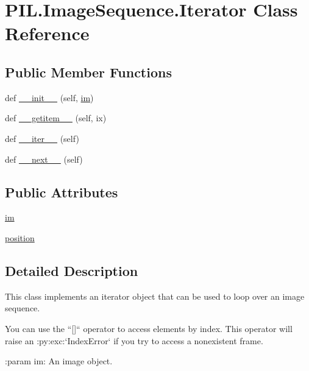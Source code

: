 \hypertarget{classPIL_1_1ImageSequence_1_1Iterator}{}\section{P\+I\+L.\+Image\+Sequence.\+Iterator Class Reference}
\label{classPIL_1_1ImageSequence_1_1Iterator}
\subsection*{Public Member Functions}
\begin{DoxyCompactItemize}
\item 
def \hyperlink{classPIL_1_1ImageSequence_1_1Iterator_a8119a58e651fe637a37376709d49a78a}{\+\_\+\+\_\+init\+\_\+\+\_\+} (self, \hyperlink{classPIL_1_1ImageSequence_1_1Iterator_a4aed17166801d2e3a6f334aef48f06e1}{im})
\item 
def \hyperlink{classPIL_1_1ImageSequence_1_1Iterator_a0aca8634fbe3f8905f37fe6f5c68d663}{\+\_\+\+\_\+getitem\+\_\+\+\_\+} (self, ix)
\item 
def \hyperlink{classPIL_1_1ImageSequence_1_1Iterator_a9d8b27292e63547887be7afd4fa87790}{\+\_\+\+\_\+iter\+\_\+\+\_\+} (self)
\item 
def \hyperlink{classPIL_1_1ImageSequence_1_1Iterator_a2e579dd30b58258f7fed69b955e3c9da}{\+\_\+\+\_\+next\+\_\+\+\_\+} (self)
\end{DoxyCompactItemize}
\subsection*{Public Attributes}
\begin{DoxyCompactItemize}
\item 
\hyperlink{classPIL_1_1ImageSequence_1_1Iterator_a4aed17166801d2e3a6f334aef48f06e1}{im}
\item 
\hyperlink{classPIL_1_1ImageSequence_1_1Iterator_a5642701505b3da9045e6a1eb3257f10d}{position}
\end{DoxyCompactItemize}


\subsection{Detailed Description}
\begin{DoxyVerb}This class implements an iterator object that can be used to loop
over an image sequence.

You can use the ``[]`` operator to access elements by index. This operator
will raise an :py:exc:`IndexError` if you try to access a nonexistent
frame.

:param im: An image object.
\end{DoxyVerb}
 

